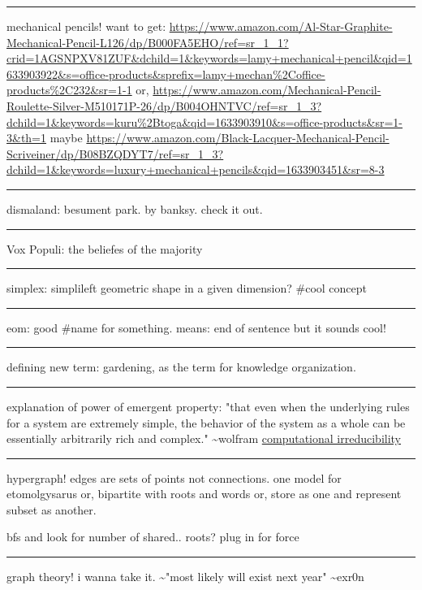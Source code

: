 \documentclass[letterpaper]{article}
\begin{document}
\noindent\rule{\textwidth}{0.5pt}

mechanical pencils! want to get:
\url{https://www.amazon.com/Al-Star-Graphite-Mechanical-Pencil-L126/dp/B000FA5EHO/ref=sr\_1\_1?crid=1AGSNPXV81ZUF\&dchild=1\&keywords=lamy+mechanical+pencil\&qid=1633903922\&s=office-products\&sprefix=lamy+mechan\%2Coffice-products\%2C232\&sr=1-1}
or,
\url{https://www.amazon.com/Mechanical-Pencil-Roulette-Silver-M510171P-26/dp/B004OHNTVC/ref=sr\_1\_3?dchild=1\&keywords=kuru\%2Btoga\&qid=1633903910\&s=office-products\&sr=1-3\&th=1}
maybe
\url{https://www.amazon.com/Black-Lacquer-Mechanical-Pencil-Scriveiner/dp/B08BZQDYT7/ref=sr\_1\_3?dchild=1\&keywords=luxury+mechanical+pencils\&qid=1633903451\&sr=8-3}

\noindent\rule{\textwidth}{0.5pt}

dismaland: besument park. by banksy. check it out.

\noindent\rule{\textwidth}{0.5pt}

Vox Populi: the beliefes of the majority

\noindent\rule{\textwidth}{0.5pt}

simplex: simplileft geometric shape in a given dimension? \#cool concept

\noindent\rule{\textwidth}{0.5pt}

eom: good \#name for something. means: end of sentence but it sounds
cool!

\noindent\rule{\textwidth}{0.5pt}

defining new term: gardening, as the term for knowledge organization.

\noindent\rule{\textwidth}{0.5pt}

explanation of power of emergent property: "that even when the
underlying rules for a system are extremely simple, the behavior of the
system as a whole can be essentially arbitrarily rich and complex."
\textasciitilde{}wolfram
\href{https://www.wolframscience.com/nks/p737--computational-irreducibility/}{computational
irreducibility}

\noindent\rule{\textwidth}{0.5pt}

hypergraph! edges are sets of points not connections. one model for
etomolgysarus or, bipartite with roots and words or, store as one and
represent subset as another.

bfs and look for number of shared.. roots? plug in for force

\noindent\rule{\textwidth}{0.5pt}

graph theory! i wanna take it. \textasciitilde{}"most likely will exist next year"
\textasciitilde{}exr0n
\end{document}
